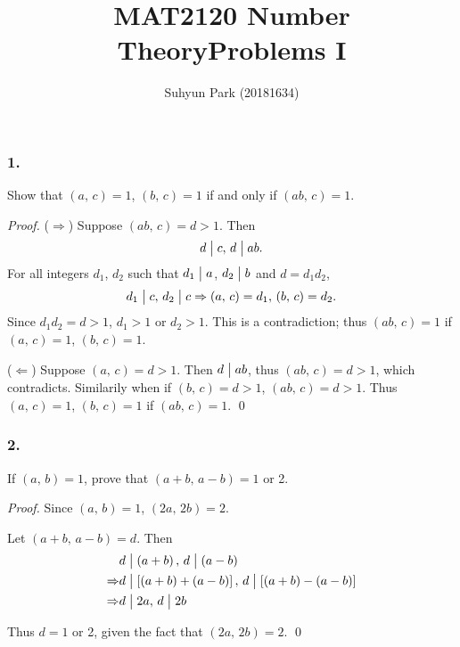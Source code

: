 



\title{MAT2120 Number Theory\newline\space Problems I}
\author{Suhyun Park (20181634)}

\maketitle

\subsubsection{1.} Show that $\left(a,\,c\right)=1$, $\left(b,\,c\right)=1$
if and only if $\left(ab,\,c\right)=1$.

\begin{proof}
    ($\Rightarrow$) Suppose $\left(ab,\,c\right)=d>1$. Then
    \[
        d \bigm| c,\, d \bigm| ab.    
    \]
    For all integers $d_1$, $d_2$ such that $d_1 \bigm| a$, $d_2 \bigm| b$
    and $d=d_1d_2$,
    \[
        d_1 \bigm| c,\, d_2\bigm| c \Rightarrow \left(a,\,c\right) = d_1,\, \left(b,\,c\right) = d_2.    
    \]
    Since $d_1d_2 = d > 1$, $d_1 > 1$ or $d_2 > 1$. This is a contradiction;
    thus $\left(ab,\,c\right)=1$ if $\left(a,\,c\right)=1$, $\left(b,\,c\right)=1$.

    ($\Leftarrow$) Suppose $\left(a,\,c\right)=d>1$. Then $d \bigm| ab$, thus
    $\left(ab,\,c\right)=d>1$, which contradicts. Similarily when if
    $\left(b,\,c\right)=d>1$, $\left(ab,\,c\right)=d>1$. Thus $\left(a,\,c\right)=1$, $\left(b,\,c\right)=1$
    if $\left(ab,\,c\right)=1$. \qed
\end{proof}

\subsubsection{2.} If $\left(a,\,b\right)=1$, prove that $\left(a+b,\,a-b\right)=1$ or 2.

\begin{proof}
    Since $\left(a,\,b\right)=1$, $\left(2a,\,2b\right)=2$.

    Let $\left(a+b,\,a-b\right)=d$. Then
    \begin{align*}
        & d \bigm| \left(a+b\right),\, d\bigm| \left(a-b\right) \\
        \Rightarrow & d \bigm| \left[\left(a+b\right)+\left(a-b\right)\right],\,
        d \bigm| \left[\left(a+b\right)-\left(a-b\right)\right] \\
        \Rightarrow & d \bigm| 2a,\, d\bigm| 2b
    \end{align*}

    Thus $d = 1$ or 2, given the fact that $\left(2a,\,2b\right)=2$. \qed
\end{proof}


